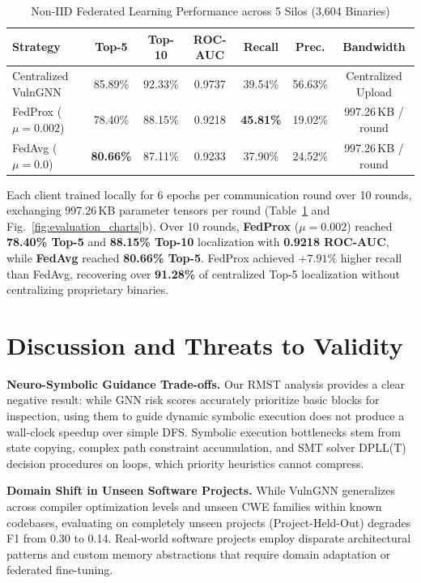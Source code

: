 \documentclass[10pt,conference]{IEEEtran}
\begin{document}
\begin{table}[!t]
\caption{Non-IID Federated Learning Performance across 5 Silos (3{,}604 Binaries)}
\label{tab:federated}
\renewcommand{\arraystretch}{1.0}
\footnotesize
\setlength\tabcolsep{2.2pt}
\begin{tabular}{lcccccc}
\toprule
\textbf{Strategy} & \textbf{Top-5} & \textbf{Top-10} & \textbf{ROC-AUC} & \textbf{Recall} & \textbf{Prec.} & \textbf{Bandwidth} \\
\midrule
Centralized VulnGNN     & 85.89\% & 92.33\% & 0.9737 & 39.54\% & 56.63\% & Centralized Upload \\
FedProx ($\mu = 0.002$) & 78.40\% & 88.15\% & 0.9218 & \textbf{45.81\%} & 19.02\% & 997.26\,KB / round \\
FedAvg ($\mu = 0.0$)    & \textbf{80.66\%} & 87.11\% & 0.9233 & 37.90\% & 24.52\% & 997.26\,KB / round \\
\bottomrule
\end{tabular}
\end{table}

Each client trained locally for 6 epochs per communication round over 10 rounds, exchanging 997.26\,KB parameter tensors per round
(Table~\ref{tab:federated} and Fig.~\ref{fig:evaluation_charts}b). Over 10 rounds, \textbf{FedProx} ($\mu = 0.002$) reached \textbf{78.40\% Top-5}
and \textbf{88.15\% Top-10} localization with \textbf{0.9218 ROC-AUC}, while \textbf{FedAvg} reached \textbf{80.66\% Top-5}. FedProx achieved
$+7.91\%$ higher recall than FedAvg, recovering over \textbf{91.28\%} of centralized Top-5 localization without centralizing proprietary binaries.

\section{Discussion and Threats to Validity}
\label{sec:limits}

\textbf{Neuro-Symbolic Guidance Trade-offs.} Our RMST analysis provides a clear negative result: while GNN risk scores accurately
prioritize basic blocks for inspection, using them to guide dynamic symbolic execution does not produce a wall-clock speedup over
simple DFS. Symbolic execution bottlenecks stem from state copying, complex path constraint accumulation, and SMT solver DPLL(T)
decision procedures on loops, which priority heuristics cannot compress.

\textbf{Domain Shift in Unseen Software Projects.} While VulnGNN generalizes across compiler optimization levels and unseen CWE
families within known codebases, evaluating on completely unseen projects (Project-Held-Out) degrades F1 from 0.30 to 0.14. Real-world
software projects employ disparate architectural patterns and custom memory abstractions that require domain adaptation or
federated fine-tuning.
\end{document}
